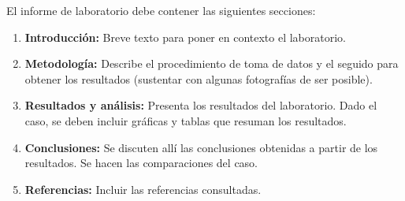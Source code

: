 \documentclass[10pt, a4paper]{exam}
\begin{document}
El informe de laboratorio debe contener las siguientes secciones:

\begin{enumerate}

    \item \textbf{Introducción:} Breve texto para poner en contexto el laboratorio.
    
    \item \textbf{Metodología:} Describe el procedimiento de toma de datos y el seguido para obtener los resultados (sustentar con algunas fotografías de ser posible).
    
    \item \textbf{Resultados y análisis:} Presenta los resultados del laboratorio. Dado el caso, se deben incluir gráficas y tablas que resuman los resultados.
    
    \item \textbf{Conclusiones:} Se discuten allí las conclusiones obtenidas a partir de los resultados. Se hacen las comparaciones del caso.
    
    \item \textbf{Referencias:} Incluir las referencias consultadas.
\end{enumerate}
\end{document}
